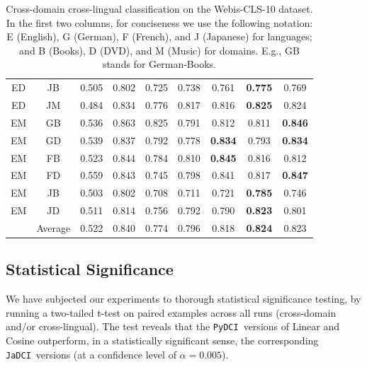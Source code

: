 \documentclass{article}
\newcommand{\jadci}{\texttt{JaDCI}}
\newcommand{\pydci}{\texttt{PyDCI}}
\begin{document}
\begin{table}[ht!]
\begin{tabular}{|c|c||c|c|c||c|c||c|c|}
    ED         & JB          & 0.505         & 0.802         & 0.725 & 0.738    & 0.761           & \textbf{0.775} & 0.769          \\
    ED         & JM          & 0.484         & 0.834         & 0.776 & 0.817    & 0.816           & \textbf{0.825} & 0.824          \\ \hline
    EM         & GB          & 0.536         & 0.863         & 0.825 & 0.791    & 0.812           & 0.811          & \textbf{0.846} \\
    EM         & GD          & 0.539         & 0.837         & 0.792 & 0.778    & \textbf{0.834}  & 0.793          & \textbf{0.834} \\
    EM         & FB          & 0.523         & 0.844         & 0.784 & 0.810    & \textbf{0.845}  & 0.816          & 0.812          \\
    EM         & FD          & 0.559         & 0.843         & 0.745 & 0.798    & 0.841           & 0.817          & \textbf{0.847} \\
    EM         & JB          & 0.503         & 0.802         & 0.708 & 0.711    & 0.721           & \textbf{0.785} & 0.746          \\
    EM         & JD          & 0.511         & 0.814         & 0.756 & 0.792    & 0.790           & \textbf{0.823} & 0.801          \\ \hline \hline
                                & Average     & 0.522         & 0.840         & 0.774 & 0.796    & 0.818           & \textbf{0.824} & 0.823  \\\hline     
  \end{tabular}
  \caption{Cross-domain cross-lingual classification on the
  Webis-CLS-10 dataset. In the first two columns, for conciseness we
  use the following notation: E (English), G (German), F (French), and
  J (Japanese) for languages; and B (Books), D (DVD), and M (Music)
  for domains. E.g., GB stands for German-Books.}
  \label{tab:webis2}
\end{table}




\subsection{Statistical Significance}
\label{sec:stat}

\noindent We have subjected our experiments to thorough statistical
significance testing, by running a two-tailed t-test on paired
examples across all runs (cross-domain and/or cross-lingual). The test
reveals that the \pydci\ versions of Linear and Cosine outperform, in
a statistically significant sense, the corresponding \jadci\ versions
(at a confidence level of $\alpha=0.005$).
\end{document}

